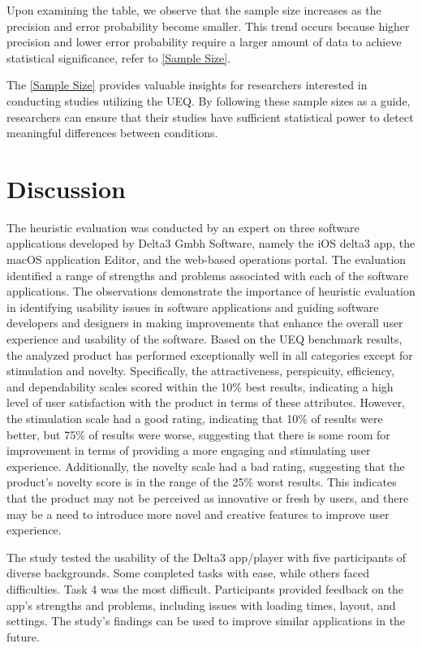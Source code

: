 \documentclass[conference,onecolumn]{IEEEtran}
\begin{document}
            Upon examining the table, we observe that the sample size increases as the precision and error probability become smaller. This trend occurs because higher precision and lower error probability require a larger amount of data to achieve statistical significance, refer to \tablename{ \ref{Sample Size}}.

            The \tablename{ \ref{Sample Size}} provides valuable insights for researchers interested in conducting studies utilizing the UEQ. By following these sample sizes as a guide, researchers can ensure that their studies have sufficient statistical power to detect meaningful differences between conditions.
        
\section{Discussion}

    The heuristic evaluation was conducted by an expert on three software applications developed by Delta3 Gmbh Software, namely the iOS delta3 app, the macOS application Editor, and the web-based operations portal. The evaluation identified a range of strengths and problems associated with each of the software applications. The observations demonstrate the importance of heuristic evaluation in identifying usability issues in software applications and guiding software developers and designers in making improvements that enhance the overall user experience and usability of the software.    Based on the UEQ benchmark results, the analyzed product has performed exceptionally well in all categories except for stimulation and novelty. Specifically, the attractiveness, perspicuity, efficiency, and dependability scales scored within the 10\% best results, indicating a high level of user satisfaction with the product in terms of these attributes. However, the stimulation scale had a good rating, indicating that 10\% of results were better, but 75\% of results were worse, suggesting that there is some room for improvement in terms of providing a more engaging and stimulating user experience. Additionally, the novelty scale had a bad rating, suggesting that the product's novelty score is in the range of the 25\% worst results. This indicates that the product may not be perceived as innovative or fresh by users, and there may be a need to introduce more novel and creative features to improve user experience.

    The study tested the usability of the Delta3 app/player with five participants of diverse backgrounds. Some completed tasks with ease, while others faced difficulties. Task 4 was the most difficult. Participants provided feedback on the app's strengths and problems, including issues with loading times, layout, and settings. The study's findings can be used to improve similar applications in the future.
    
\end{document}

